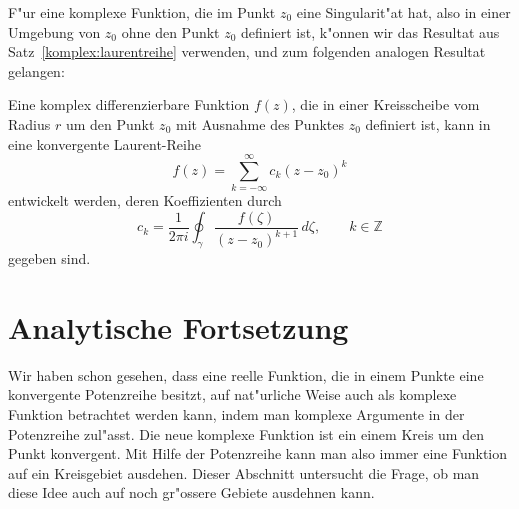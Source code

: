F"ur eine komplexe Funktion, die im Punkt $z_0$ eine Singularit"at hat,
also in einer Umgebung von $z_0$ ohne den Punkt $z_0$ definiert ist,
k"onnen wir das Resultat aus Satz~\ref{komplex:laurentreihe} verwenden,
und zum folgenden analogen Resultat gelangen:

\begin{satz}
Eine komplex differenzierbare Funktion $f(z)$, die in einer Kreisscheibe
vom Radius $r$ um den Punkt $z_0$ mit Ausnahme des Punktes $z_0$
definiert ist, kann in eine konvergente Laurent-Reihe
\[
f(z)=\sum_{k=-\infty}^{\infty} c_k(z-z_0)^k
\]
entwickelt werden, deren Koeffizienten durch
\[
c_k = \frac1{2\pi i}\oint_\gamma \frac{f(\zeta)}{(z-z_0)^{k+1}}\,d\zeta,\qquad k\in\mathbb Z
\]
gegeben sind.
\end{satz}

%
%
\section{Analytische Fortsetzung}
\label{sec:fortsetzung}
Wir haben schon gesehen, dass eine reelle Funktion, die in einem
Punkte eine konvergente
Potenzreihe besitzt, auf nat"urliche Weise auch als komplexe Funktion
betrachtet werden kann, indem man komplexe Argumente in der Potenzreihe
zul"asst.
Die neue komplexe Funktion ist ein einem Kreis um den Punkt
konvergent.
Mit Hilfe der Potenzreihe kann man also immer eine Funktion auf ein
Kreisgebiet ausdehen.
Dieser Abschnitt untersucht die Frage, ob man diese Idee auch auf 
noch gr"ossere Gebiete ausdehnen kann.
